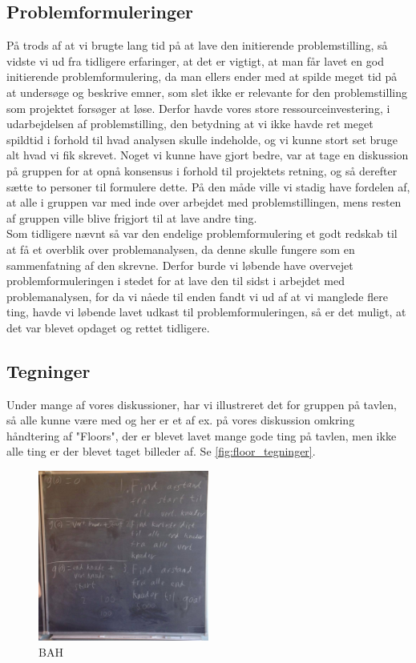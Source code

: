 \documentclass[a4paper,12pt,oneside,article]{memoir}
\begin{document}
        \subsection{Problemformuleringer}

        På trods af at vi brugte lang tid på at lave den initierende problemstilling, så vidste vi ud fra tidligere erfaringer, at det er vigtigt, at man får lavet en god initierende problemformulering, da man ellers ender med at spilde meget tid på at undersøge og beskrive emner, som slet ikke er relevante for den problemstilling som projektet forsøger at løse. Derfor havde vores store ressourceinvestering, i udarbejdelsen af problemstilling, den betydning at vi ikke havde ret meget spildtid i forhold til hvad analysen skulle indeholde, og vi kunne stort set bruge alt hvad vi fik skrevet. Noget vi kunne have gjort bedre, var at tage en diskussion på gruppen for at opnå konsensus i forhold til projektets retning, og så derefter sætte to personer til formulere dette. På den måde ville vi stadig have fordelen af, at alle i gruppen var med inde over arbejdet med problemstillingen, mens resten af gruppen ville blive frigjort til at lave andre ting. \\
        Som tidligere nævnt så var den endelige problemformulering et godt redskab til at få et overblik over problemanalysen, da denne skulle fungere som en sammenfatning af den skrevne. Derfor burde vi løbende have overvejet problemformuleringen i stedet for at lave den til sidst i arbejdet med problemanalysen, for da vi nåede til enden fandt vi ud af at vi manglede flere ting, havde vi løbende lavet udkast til problemformuleringen, så er det muligt, at det var blevet opdaget og rettet tidligere.

        
           

        \subsection{Tegninger}
        Under mange af vores diskussioner, har vi illustreret det for gruppen på tavlen, så alle kunne være  med og her er et af ex. på vores diskussion omkring håndtering af "Floors", der er blevet lavet mange gode ting på tavlen, men ikke alle ting er der blevet taget billeder af. Se \cref{fig:floor_tegninger}.

        \begin{figure}[ht!]
            \centering
            \includegraphics[width=0.5\textwidth]{Images/5.jpg}
            \caption{BAH}
            \label{4}
        \end{figure}
\end{document}

